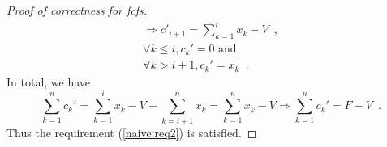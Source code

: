 \begin{proof}[Proof of correctness for fcfs]
\begin{equation*}
\begin{gathered}
      \Rightarrow c'_{i+1} = \sum\limits_{k=1}^{i}x_k - V \enspace, \\
      \forall k \leq i, c_k' = 0 \mbox{ and} \\
      \forall k > i+1, c_k' = x_k \enspace.
   \end{gathered}
   \end{equation*}
   In total, we have
   \begin{equation*}
      \sum\limits_{k=1}^{n}c_k' = \sum\limits_{k=1}^{i}x_k - V + \sum\limits_{k=i+1}^{n}x_k =
   \sum\limits_{k=1}^{n}x_k - V \Rightarrow \sum\limits_{k=1}^{n}c_k' = F - V \enspace.
   \end{equation*}
   Thus the requirement (\ref{naive:req2}) is satisfied.
\end{proof}
